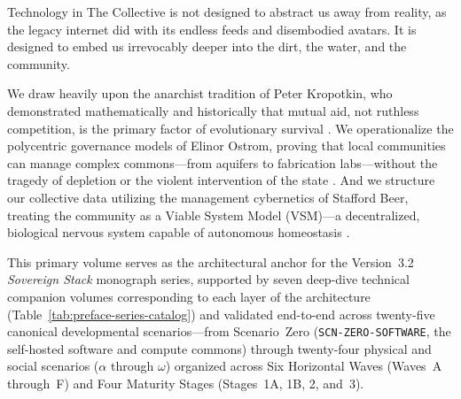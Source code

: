 Technology in The Collective is not designed to abstract us away from reality, as the legacy internet did with its endless feeds and disembodied avatars. It is designed to embed us irrevocably deeper into the dirt, the water, and the community. 

We draw heavily upon the anarchist tradition of Peter Kropotkin, who demonstrated mathematically and historically that mutual aid, not ruthless competition, is the primary factor of evolutionary survival \parencite{kropotkin1902}. We operationalize the polycentric governance models of Elinor Ostrom, proving that local communities can manage complex commons---from aquifers to fabrication labs---without the tragedy of depletion or the violent intervention of the state \parencite{ostrom1990}. And we structure our collective data utilizing the management cybernetics of Stafford Beer, treating the community as a Viable System Model (VSM)---a decentralized, biological nervous system capable of autonomous homeostasis \parencite{beer1972}.

This primary volume serves as the architectural anchor for the Version~3.2 \textit{Sovereign Stack} monograph series, supported by seven deep-dive technical companion volumes corresponding to each layer of the architecture (Table~\ref{tab:preface-series-catalog}) and validated end-to-end across twenty-five canonical developmental scenarios---from Scenario~Zero (\texttt{SCN-ZERO-SOFTWARE}, the self-hosted software and compute commons) through twenty-four physical and social scenarios ($\alpha$ through $\omega$) organized across Six Horizontal Waves (Waves~A through~F) and Four Maturity Stages (Stages~1A, 1B, 2, and~3).

